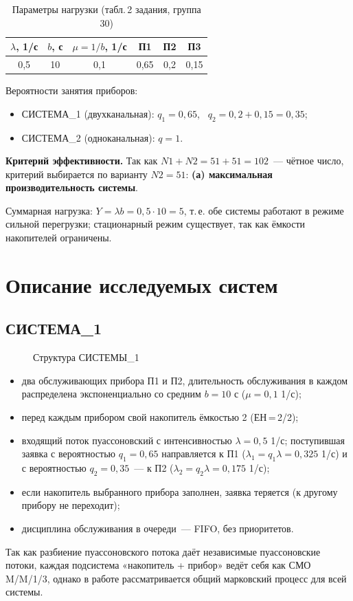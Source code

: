 \documentclass[12pt,a4paper]{article}
\begin{document}
\begin{table}[H]
\centering
\caption{Параметры нагрузки (табл.\,2 задания, группа 30)}
\begin{tabular}{cccccc}
\toprule
$\lambda$, 1/с & $b$, с & $\mu=1/b$, 1/с & П1 & П2 & П3 \\
\midrule
0,5 & 10 & 0,1 & 0,65 & 0,2 & 0,15 \\
\bottomrule
\end{tabular}
\end{table}

Вероятности занятия приборов:
\begin{itemize}
\item СИСТЕМА\_1 (двухканальная): $q_1 = 0{,}65$, \ $q_2 = 0{,}2 + 0{,}15 = 0{,}35$;
\item СИСТЕМА\_2 (одноканальная): $q = 1$.
\end{itemize}

\textbf{Критерий эффективности.} Так как $N1 + N2 = 51 + 51 = 102$~--- чётное число,
критерий выбирается по варианту $N2 = 51$: \textbf{(а) максимальная производительность системы}.

Суммарная нагрузка: $Y = \lambda b = 0{,}5\cdot 10 = 5$, т.\,е. обе системы работают в режиме
сильной перегрузки; стационарный режим существует, так как ёмкости накопителей ограничены.

\section{Описание исследуемых систем}
\subsection{СИСТЕМА\_1}
\begin{figure}[H]\centering\schemeOne\caption{Структура СИСТЕМЫ\_1}\end{figure}
\begin{itemize}
\item два обслуживающих прибора П1 и П2, длительность обслуживания в каждом распределена экспоненциально со средним $b = 10$ с ($\mu = 0{,}1$ 1/с);
\item перед каждым прибором свой накопитель ёмкостью 2 (ЕН\,=\,2/2);
\item входящий поток пуассоновский с интенсивностью $\lambda = 0{,}5$ 1/с; поступившая заявка с вероятностью $q_1 = 0{,}65$ направляется к П1 ($\lambda_1 = q_1\lambda = 0{,}325$ 1/с) и с вероятностью $q_2 = 0{,}35$~--- к П2 ($\lambda_2 = q_2\lambda = 0{,}175$ 1/с);
\item если накопитель выбранного прибора заполнен, заявка теряется (к другому прибору не переходит);
\item дисциплина обслуживания в очереди~--- FIFO, без приоритетов.
\end{itemize}
Так как разбиение пуассоновского потока даёт независимые пуассоновские потоки, каждая подсистема
«накопитель + прибор» ведёт себя как СМО M/M/1/3, однако в работе рассматривается общий марковский
процесс для всей системы.
\end{document}
